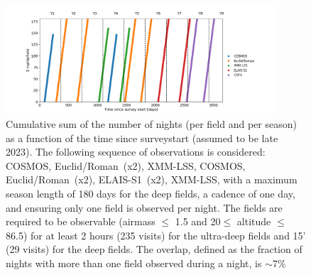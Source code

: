 \documentclass[skiphelvet,twocolumn]{lsstdescnote}
\newcommand{\cosmos}{{COSMOS}}
\newcommand{\elais}{{ELAIS-S1}}
\newcommand{\xmm}{{XMM-LSS}}
\newcommand{\adfs}{{Euclid/Roman}}
\begin{document}
\begin{figure}[htbp]
\begin{center}
  \includegraphics[width=0.9\textwidth]{timely_sequence_235visits.png}
  \caption{ Cumulative sum of the number of nights (per field and per season) as a function of the time since surveystart (assumed to be late 2023).  The following sequence of observations is considered: \cosmos, \adfs~(x2), \xmm, \cosmos, \adfs~(x2), \elais~(x2), \xmm ,  with  a  maximum  season  length  of  180  days for the deep fields,  a  cadence  of  one day, and ensuring only one field is observed per night.  The fields are required to be observable (airmass $\leq$ 1.5 and 20\textdegree $\leq$ altitude $\leq$ 86.5\textdegree) for at least 2 hours (235 visits) for the ultra-deep fields and 15' (29 visits) for the deep fields.  The overlap, defined as the fraction of nights with more than one field observed during a night, is $\sim7\%$}\label{fig:timelysequence}
\end{center}
\end{figure}
\end{document}
